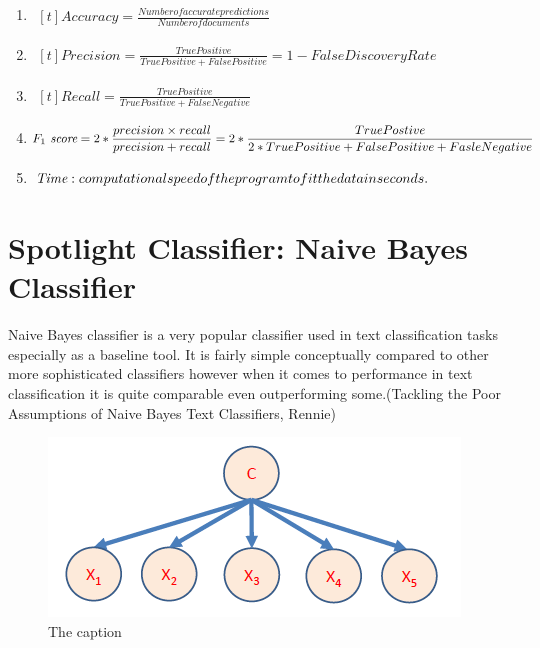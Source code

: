 \documentclass{article} %
\begin{document}
\begin{enumerate}
\item $\begin{aligned}[t]
    {Accuracy} = \frac{Number of accurate predictions}{Number of documents}
\end{aligned}$
\item $\begin{aligned}[t]
    {Precision} = \frac {True Positive}{True Positive+False Positive} = 1 - False Discovery Rate
\end{aligned}$
\item $\begin{aligned}[t]
    {Recall} = \frac {TruePositive}{TruePositive+FalseNegative}
\end{aligned}$
\item $\begin{aligned}[t]
   \emph{$F_1$ score}=  2 *\frac {precision \times recall} {precision + recall} = 2 *\frac{TruePostive}{2*TruePositive+FalsePositive+FasleNegative}
\end{aligned}$
\item $\begin{aligned}[t]
   \emph{Time} : computational speed of the program to fit the data in seconds.
\end{aligned}$
\end{enumerate}

\section{Spotlight Classifier: Naive Bayes Classifier}
Naive Bayes classifier is a very popular classifier used in text classification tasks especially as a baseline tool. It is fairly simple conceptually compared to other more sophisticated classifiers however when it comes to  performance in text classification it is quite comparable even outperforming some.\cite{Rennie03}(Tackling the Poor Assumptions of Naive Bayes Text Classifiers, Rennie)



\begin{figure}[H]
  \centering
  \includegraphics[scale=0.5]{bernoulliNBexample1}
  \caption{The caption}   
  \label{fig:picture}
\end{figure}
\end{document}
